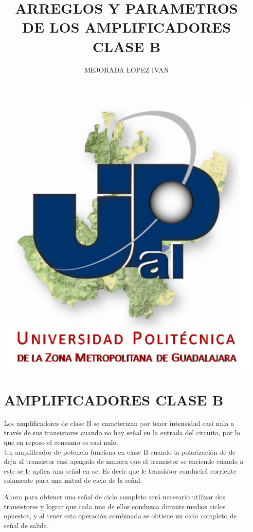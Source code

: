 \documentclass[12pt,a4paper]{article}
\author{MEJORADA LOPEZ IVAN}
\title{ARREGLOS Y PARAMETROS DE LOS AMPLIFICADORES CLASE B}
\begin{document}
\maketitle
\includegraphics[width=17.5cm]{UPZMG_Prueba_1b.png} 
\newpage
\section{AMPLIFICADORES CLASE B}
 Los amplificadores de clase B se caracterizan por tener intensidad casi nula a trav\'es de sus transistores cuando no hay se\~nal en la entrada del circuito, por lo que en reposo el consumo es casi nulo.\\Un amplificador de potencia funciona en clase B cuando la polarizaci\'on de dc deja al transistor casi apagado de manera que el transistor se enciende cuando a este se le aplica una se\~nal en ac. Es decir que le transistor conducir\'a corriente solamente para una mitad de ciclo de la se\~nal.

Ahora para obtener una se\~nal de ciclo completo ser\'a necesario utilizar dos transistores y lograr que cada uno de ellos conduzca durante medios ciclos opuestos, y al tener esta operaci\'on combinada se obtiene un ciclo completo de se\~nal de salida.
\end{document}
